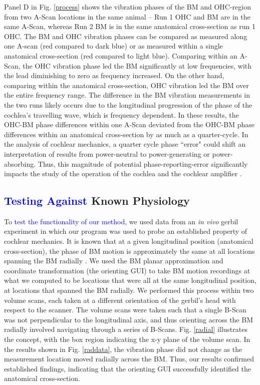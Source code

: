 \documentclass[preprint,NumberedRefs]{JASA}
\begin{document}
\par{Panel D in Fig. \ref{process} shows the vibration phases of the BM and OHC-region from two A-Scan locations in the same animal --  Run 1 OHC and BM are in the same A-Scan, whereas Run 2 BM is in the same anatomical cross-section as run 1 OHC. The BM and OHC vibration phases can be compared as measured along one A-scan (red compared to dark blue) or as measured within a single anatomical cross-section (red compared to light blue). Comparing within an A-Scan, the OHC vibration phase led the BM significantly at low frequencies, with the lead diminishing to zero as frequency increased. On the other hand, comparing within the anatomical cross-section, OHC vibration led the BM over the entire frequency range. The difference in the BM vibration measurements in the two runs likely occurs due to the longitudinal progression of the phase of the cochlea's travelling wave, which is frequency dependent. In these results, the OHC-BM phase differences within one A-Scan deviated from the OHC-BM phase differences within an anatomical cross-section by as much as a quarter-cycle. In the analysis of cochlear mechanics, a quarter cycle phase ``error" could shift an interpretation of results from power-neutral to power-generating or power-absorbing.  Thus, this magnitude of potential phase-reporting-error significantly impacts the study of the operation of the cochlea and the cochlear amplifier \citep{cooper, dongolson, fallah}.}

\subsection{\textcolor{blue}{Testing Against} Known Physiology}
\par{To \textcolor{blue}{test the functionality of our method}, we used data from an \textit{in vivo} gerbil experiment in which our program was used to probe an established property of cochlear mechanics. It is known that at a given longitudinal position (anatomical cross-section), the phase of BM motion is approximately the same at all locations spanning the BM radially \citep{cooperMOHJapan, Warren}. We used the BM planar approximation and coordinate transformation (the orienting GUI) to take BM motion recordings at what we computed to be locations that were all at the same longitudinal position, at locations that spanned the BM radially. We performed this process within two volume scans, each taken at a different orientation of the gerbil's head with respect to the scanner. The volume scans were taken such that a single B-Scan was not perpendicular to the longitudinal axis, and thus orienting across the BM radially involved navigating through a series of B-Scans. Fig. \ref{radial} illustrates the concept, with the box region indicating the x-y plane of the volume scan. In the results shown in Fig. \ref{raddata}, the vibration phase did not change as the measurement location moved radially across the BM. Thus, our results confirmed established findings, indicating that the orienting GUI successfully identified the anatomical cross-section.} 
\end{document}
